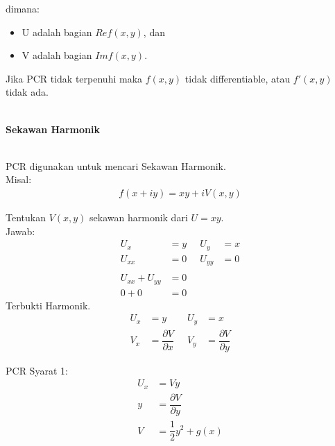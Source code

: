 \documentclass{article}
\begin{document}
    dimana:
    \begin{itemize}
        \item U adalah bagian $Re f(x,y)$, dan
        \item V adalah bagian $Im f(x,y)$.
    \end{itemize}

    Jika PCR tidak terpenuhi maka $f(x,y)$ tidak differentiable, atau $f'(x,y)$ tidak ada.
    \leavevmode\\ \\

    \begin{center}
        \textbf{Sekawan Harmonik}
    \end{center}
    \leavevmode\\
    
    PCR digunakan untuk mencari Sekawan Harmonik.\\

    Misal:
    \begin{align}
        f(x + iy) = xy + iV(x, y)
        \nonumber
    \end{align}

    Tentukan $V(x,y)$ sekawan harmonik dari $U = xy$.\\
    Jawab:
    \begin{align}
        U_x     &= y    \;&\;   U_y     &= x
        \nonumber\\
        U_{xx}  &= 0    \;&\;   U_{yy}  &= 0   
        \nonumber\\\nonumber\\
        U_{xx}+U_{yy}&=0
        \nonumber\\
        0 + 0   &=0
        \nonumber
    \end{align}
    Terbukti Harmonik.\\

    \begin{align}
        U_x &= y                                \;&\;   U_y &= x
        \nonumber\\
        V_x &= \dfrac{\partial V}{\partial x}   \;&\;   V_y&= \dfrac{\partial V}{\partial y}
        \nonumber
    \end{align}

    PCR Syarat 1:
    \begin{align}
        U_x &= Vy
        \nonumber\\
        y   &= \dfrac{\partial V}{\partial y}
        \nonumber\\
        V   &= \dfrac{1}{2} y^2 + g(x)
        \nonumber
    \end{align}
\end{document}
